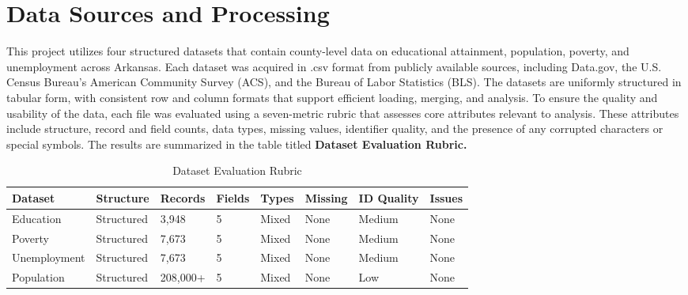 \documentclass{llncs}
\begin{document}
\section{Data Sources and Processing}
This project utilizes four structured datasets that contain county-level data on educational attainment, population, poverty, and unemployment across Arkansas. Each dataset was acquired in .csv format from publicly available sources, including Data.gov, the U.S. Census Bureau’s American Community Survey (ACS), and the Bureau of Labor Statistics (BLS). The datasets are uniformly structured in tabular form, with consistent row and column formats that support efficient loading, merging, and analysis.
To ensure the quality and usability of the data, each file was evaluated using a seven-metric rubric that assesses core attributes relevant to analysis. These attributes include structure, record and field counts, data types, missing values, identifier quality, and the presence of any corrupted characters or special symbols. The results are summarized in the table titled \textbf{Dataset Evaluation Rubric.}

\begin{table}[!ht]
\centering
\caption{Dataset Evaluation Rubric}
\label{tab:rubric}
\small
\begin{tabularx}{\textwidth}{@{}lXXXXXXX@{}}
\toprule
\textbf{Dataset} & \textbf{Structure} & \textbf{Records} & \textbf{Fields} & \textbf{Types} & \textbf{Missing} & \textbf{ID Quality} & \textbf{Issues} \\
\midrule
Education    & Structured & 3,948      & 5     & Mixed & None & Medium & None \\
Poverty      & Structured & 7,673      & 5     & Mixed & None & Medium & None \\
Unemployment & Structured & 7,673      & 5     & Mixed & None & Medium & None \\
Population   & Structured & 208,000+   & 5     & Mixed & None & Low    & None \\
\bottomrule
\end{tabularx}
\end{table}
\end{document}
